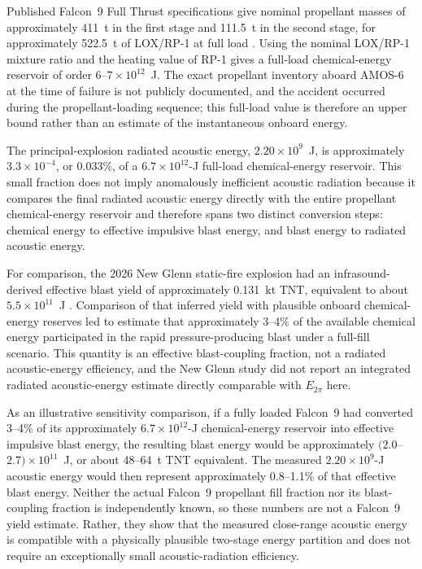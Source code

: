 \documentclass[]{seismica}
\begin{document}
Published Falcon~9 Full Thrust specifications give nominal propellant masses
of approximately 411~t in the first stage and 111.5~t in the second stage,
for approximately 522.5~t of LOX/RP-1 at full load
\citep{TODO_FALCON9_DATASHEET}. Using the nominal LOX/RP-1 mixture ratio and
the heating value of RP-1 gives a full-load chemical-energy reservoir of order
$6$--$7\times10^{12}$~J. The exact propellant inventory aboard AMOS-6 at the
time of failure is not publicly documented, and the accident occurred during
the propellant-loading sequence; this full-load value is therefore an upper
bound rather than an estimate of the instantaneous onboard energy.

The principal-explosion radiated acoustic energy,
$2.20\times10^9$~J, is approximately $3.3\times10^{-4}$, or 0.033\%, of a
$6.7\times10^{12}$-J full-load chemical-energy reservoir. This small fraction
does not imply anomalously inefficient acoustic radiation because it compares
the final radiated acoustic energy directly with the entire propellant
chemical-energy reservoir and therefore spans two distinct conversion steps:
chemical energy to effective impulsive blast energy, and blast energy to
radiated acoustic energy.

For comparison, the 2026 New Glenn static-fire explosion had an
infrasound-derived effective blast yield of approximately 0.131~kt TNT,
equivalent to about $5.5\times10^{11}$~J
\citep{silber_scamfer_newglenn_2026}. Comparison of that inferred yield with
plausible onboard chemical-energy reserves led
\citet{silber_scamfer_newglenn_2026} to estimate that approximately 3--4\%
of the available chemical energy participated in the rapid pressure-producing
blast under a full-fill scenario. This quantity is an effective blast-coupling
fraction, not a radiated acoustic-energy efficiency, and the New Glenn study
did not report an integrated radiated acoustic-energy estimate directly
comparable with $E_{2\pi}$ here.

As an illustrative sensitivity comparison, if a fully loaded Falcon~9 had
converted 3--4\% of its approximately $6.7\times10^{12}$-J chemical-energy
reservoir into effective impulsive blast energy, the resulting blast energy
would be approximately $(2.0$--$2.7)\times10^{11}$~J, or about 48--64~t TNT
equivalent. The measured $2.20\times10^9$-J acoustic energy would then
represent approximately 0.8--1.1\% of that effective blast energy. Neither the
actual Falcon~9 propellant fill fraction nor its blast-coupling fraction is
independently known, so these numbers are not a Falcon~9 yield estimate.
Rather, they show that the measured close-range acoustic energy is compatible
with a physically plausible two-stage energy partition and does not require an
exceptionally small acoustic-radiation efficiency.
\end{document}
